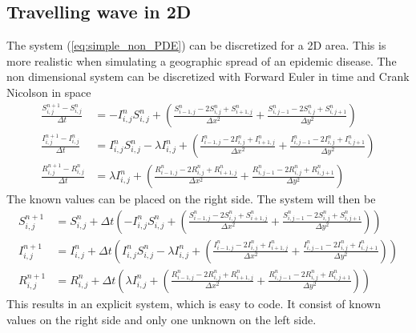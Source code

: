 \documentclass[%
twoside,                 %
final,                   %
10pt]{article}
\begin{document}
\subsection{Travelling wave in 2D}
The system (\ref{eq:simple_non_PDE}) can be discretized for a 2D area. This is more realistic when simulating a geographic spread of an epidemic disease. The non dimensional system  can be discretized with Forward Euler in time and Crank Nicolson in space
\begin{equation} \label{eq:SIR_disc}
	\begin{aligned}
    \frac{S^{n+1}_{i,j}-S^n_{i,j}}{\Delta t} &= -I^{n}_{i,j}S^{n}_{i,j} + \left(\frac{S^{n}_{i-1,j}-2S^{n}_{i,j}+S^{n}_{i+1,j}}{\Delta x^2}+\frac{S^{n}_{i,j-1}-2S^{n}_{i,j}+S^{n}_{i,j+1}}{\Delta y^2}\right) \\
    \frac{I^{n+1}_{i,j}-I^n_{i,j}}{\Delta t} &= I^{n}_{i,j}S^{n}_{i,j} -\lambda I^{n}_{i,j} + \left(\frac{I^{n}_{i-1,j}-2I^{n}_{i,j}+I^{n}_{i+1,j}}{\Delta x^2}+\frac{I^{n}_{i,j-1}-2I^{n}_{i,j}+I^{n}_{i,j+1}}{\Delta y^2}\right) \\
    \frac{R^{n+1}_{i,j}-R^n_{i,j}}{\Delta t} &= \lambda I^{n}_{i,j}+\left(\frac{R^{n}_{i-1,j}-2R^{n}_{i,j}+R^{n}_{i+1,j}}{\Delta x^2}+\frac{R^{n}_{i,j-1}-2R^{n}_{i,j}+R^{n}_{i,j+1}}{\Delta y^2}\right) 
	\end{aligned}
\end{equation}
The known values can be placed on the right side. The system will then be
\begin{equation}
	\begin{aligned}
    S^{n+1}_{i,j} &= S^{n}_{i,j}+\Delta t\left(-I^{n}_{i,j}S^{n}_{i,j} + \left(\frac{S^{n}_{i-1,j}-2S^{n}_{i,j}+S^{n}_{i+1,j}}{\Delta x^2}+\frac{S^{n}_{i,j-1}-2S^{n}_{i,j}+S^{n}_{i,j+1}}{\Delta y^2}\right)\right) \\
    I^{n+1}_{i,j} &= I^{n}_{i,j}+\Delta t\left(I^{n}_{i,j}S^{n}_{i,j} -\lambda I^{n}_{i,j} + \left(\frac{I^{n}_{i-1,j}-2I^{n}_{i,j}+I^{n}_{i+1,j}}{\Delta x^2}+\frac{I^{n}_{i,j-1}-2I^{n}_{i,j}+I^{n}_{i,j+1}}{\Delta y^2}\right)\right) \\
    R^{n+1}_{i,j} &= R^{n}_{i,j}+\Delta t\left(\lambda I^{n}_{i,j}+\left(\frac{R^{n}_{i-1,j}-2R^{n}_{i,j}+R^{n}_{i+1,j}}{\Delta x^2}+\frac{R^{n}_{i,j-1}-2R^{n}_{i,j}+R^{n}_{i,j+1}}{\Delta y^2}\right)\right) 
	\end{aligned}
\end{equation}
This results in an explicit system, which is easy to code. It consist of known values on the right side and only one unknown on the left side.
\end{document}
